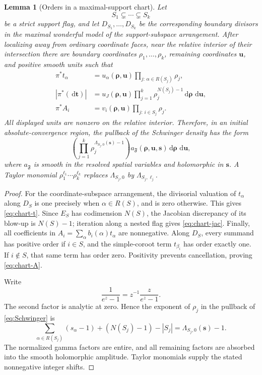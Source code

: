 \documentclass[11pt]{article}
\newtheorem{lemma}[theorem]{Lemma}
\newcommand{\dd}{\,\mathrm d}
\begin{document}
\begin{lemma}[Orders in a maximal-support chart]
\label{lem:chart-orders}
Let
\[
 S_1\subsetneq\cdots\subsetneq S_k
\]
be a strict support flag, and let
\(D_{S_1},\ldots,D_{S_k}\) be the corresponding boundary divisors in
the maximal wonderful model of the support-subspace arrangement.
After localizing away from ordinary coordinate faces, near the relative
interior of their intersection there are boundary coordinates \(\rho_1,\ldots,\rho_k\), remaining coordinates
\(\mathbf u\), and positive smooth units such that
\begin{align}
 \pi^*t_\alpha
 &=u_\alpha(\boldsymbol\rho,\mathbf u)
   \prod_{j:\,\alpha\in R(S_j)}\rho_j,
 \label{eq:chart-t}\\
 \left|\pi^*(\dd\mathbf t)\right|
 &=u_J(\boldsymbol\rho,\mathbf u)
   \prod_{j=1}^k\rho_j^{N(S_j)-1}
   \dd\boldsymbol\rho\,\dd\mathbf u,
 \label{eq:chart-jac}\\
 \pi^*A_i
 &=v_i(\boldsymbol\rho,\mathbf u)
   \prod_{j:\,i\in S_j}\rho_j.
 \label{eq:chart-A}
\end{align}
All displayed units are nonzero on the relative interior.  Therefore,
in an initial absolute-convergence region, the pullback of the
Schwinger density has the form
\begin{equation}
 \left(\prod_{j=1}^k
 \rho_j^{\Lambda_{S_j,0}(\mathbf s)-1}\right)
 a_{\mathfrak F}(\boldsymbol\rho,\mathbf u,\mathbf s)
 \dd\boldsymbol\rho\,\dd\mathbf u,
 \label{eq:chart-density}
\end{equation}
where \(a_{\mathfrak F}\) is smooth in the resolved spatial variables
and holomorphic in \(\mathbf s\).  A Taylor monomial
\(\rho_1^{\ell_1}\cdots\rho_k^{\ell_k}\) replaces
\(\Lambda_{S_j,0}\) by \(\Lambda_{S_j,\ell_j}\).
\end{lemma}

\begin{proof}
For the coordinate-subspace arrangement, the divisorial valuation of
\(t_\alpha\) along \(D_S\) is one precisely when
\(\alpha\in R(S)\), and is zero otherwise.  This gives
\eqref{eq:chart-t}.  Since \(E_S\) has codimension \(N(S)\), the
Jacobian discrepancy of its blow-up is \(N(S)-1\); iteration along a
nested flag gives \eqref{eq:chart-jac}.  Finally, all coefficients in
\(A_i=\sum_\alpha b_i(\alpha)t_\alpha\) are nonnegative.  Along
\(D_S\), every summand has positive order if \(i\in S\), and the
simple-coroot term \(t_{\beta_i}\) has order exactly one.  If
\(i\notin S\), that same term has order zero.  Positivity prevents
cancellation, proving \eqref{eq:chart-A}.

Write
\[
 \frac1{e^z-1}=z^{-1}\frac{z}{e^z-1}.
\]
The second factor is analytic at zero.  Hence the exponent of
\(\rho_j\) in the pullback of \eqref{eq:Schwinger} is
\[
 \sum_{\alpha\in R(S_j)}(s_\alpha-1)
 +(N(S_j)-1)-|S_j|
 =\Lambda_{S_j,0}(\mathbf s)-1.
\]
The normalized gamma factors are entire, and all remaining factors
are absorbed into the smooth holomorphic amplitude.  Taylor monomials
supply the stated nonnegative integer shifts.
\end{proof}
\end{document}
